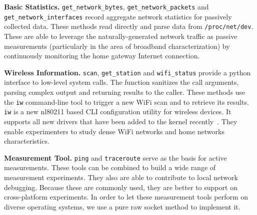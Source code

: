 {\textbf{Basic Statistics.} \texttt{get\_network\_bytes}, \texttt{get\_network\_packets} and \texttt{get\_network\_interfaces} record aggregate network statistics for passively collected data. These methods read directly and parse data from \texttt{/proc/net/dev}. These are able to leverage the naturally-generated network traffic as passive measurements (particularly in the area of broadband characterization) by continuously monitoring the home gateway Internet connection.

\textbf{Wireless Information.} \texttt{scan}, \texttt{get\_station} and \texttt{wifi\_status} provide a python interface to low-level system calls. The function sanitizes the call arguments, parsing complex output and returning results to the caller. These methods use the \texttt{iw} command-line tool to trigger a new WiFi scan and to retrieve its results. \texttt{iw} is a new nl80211 based CLI configuration utility for wireless devices. It supports all new drivers that have been added to the kernel recently~\cite{iw}. They enable experimenters to study dense WiFi networks and home networks characteristics.

\textbf{Measurement Tool.} \texttt{ping} and \texttt{traceroute} serve as the basis for active measurements. These tools can be combined to build a wide range of measurement experiments. They also are able to contribute to local network debugging. Because these are commonly used, they are better to support on cross-platform experiments. In order to let these measurement tools perform on diverse operating systems, we use a pure raw socket method to implement it. 


}
